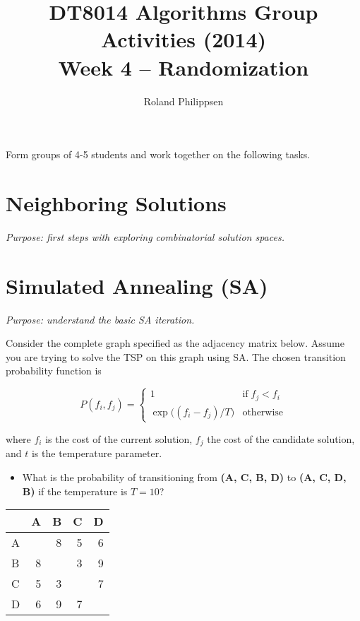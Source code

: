 \documentclass[a4paper]{article}
\begin{document}
\title{
  \large
  DT8014 Algorithms Group Activities (2014)\\
  \Large
  Week 4 -- Randomization}
\author{Roland Philippsen}
\maketitle



\noindent
Form groups of 4-5 students and work together on the following tasks.


\section*{Neighboring Solutions}

\emph{Purpose: first steps with exploring combinatorial solution spaces.}



\section*{Simulated Annealing (SA)}

\emph{Purpose: understand the basic SA iteration.}

\noindent
Consider the complete graph specified as the adjacency matrix below.
Assume you are trying to solve the TSP on this graph using SA.
The chosen transition probability function is

\begin{equation}
  P (f_i, f_j) = \begin{cases}
    1                     &\text{if}\; f_j < f_i \\
    \exp{\bigl((f_i - f_j) / T\bigr)} &\text{otherwise}
  \end{cases}
\end{equation}

\noindent
where $f_i$ is the cost of the current solution, $f_j$ the cost of the candidate solution, and $t$ is the temperature parameter.

\begin{itemize}
\item
  What is the probability of transitioning from \textbf{(A, C, B, D)} to \textbf{(A, C, D, B)} if the temperature is $T=10$?
\end{itemize}

\begin{center}
  \begin{tabular}{lrrrr}
    \toprule
      &  A &  B &  C &  D \\
    \midrule
    A &    &  8 &  5 &  6 \\
    B &  8 &    &  3 &  9 \\
    C &  5 &  3 &    &  7 \\
    D &  6 &  9 &  7 &    \\
    \bottomrule
  \end{tabular}
\end{center}
\end{document}
